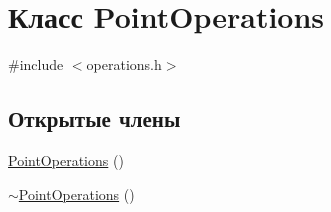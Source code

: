 \hypertarget{class_point_operations}{}\section{Класс Point\+Operations}
\label{class_point_operations}


{\ttfamily \#include $<$operations.\+h$>$}

\subsection*{Открытые члены}
\begin{DoxyCompactItemize}
\item 
\hyperlink{class_point_operations_a547905af69bcb06620ec91c2905b7650}{Point\+Operations} ()
\item 
\hyperlink{class_point_operations_ab2579f86d6be95165f93e343fcce078a}{$\sim$\+Point\+Operations} ()
\end{DoxyCompactItemize}
